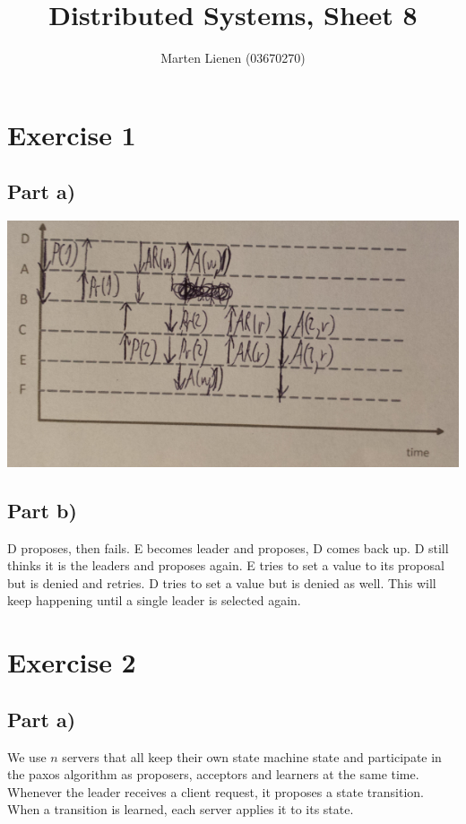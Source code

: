 \documentclass[10pt,a4paper]{article}
\title{Distributed Systems, Sheet 8}
\author{Marten Lienen (03670270)}
\begin{document}
\maketitle

\section*{Exercise 1}

\subsection*{Part a)}

\includegraphics[width=\textwidth]{sheet-8/exercise-1-a}

\subsection*{Part b)}

D proposes, then fails.
E becomes leader and proposes, D comes back up.
D still thinks it is the leaders and proposes again.
E tries to set a value to its proposal but is denied and retries.
D tries to set a value but is denied as well.
This will keep happening until a single leader is selected again.

\section*{Exercise 2}

\subsection*{Part a)}

We use $n$ servers that all keep their own state machine state and participate in the paxos algorithm as proposers, acceptors and learners at the same time.
Whenever the leader receives a client request, it proposes a state transition.
When a transition is learned, each server applies it to its state.
\end{document}
